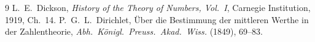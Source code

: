 \documentclass[11pt]{amsart}
\theoremstyle{remark}
\begin{document}
\begin{thebibliography}{9}
 L.~E.~Dickson, \emph{History of the Theory of Numbers, Vol.~I}, Carnegie Institution, 1919, Ch.~14.
 P.~G.~L.~Dirichlet, \"Uber die Bestimmung der mittleren Werthe in der Zahlentheorie, \emph{Abh.\ K\"onigl.\ Preuss.\ Akad.\ Wiss.} (1849), 69--83.
\end{thebibliography}
\end{document}
